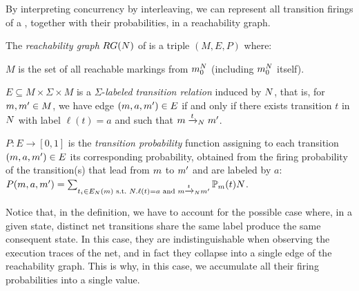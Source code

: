 By interpreting concurrency by interleaving, we can represent all transition firings of a \uswn, together with their probabilities, in a reachability graph.

\begin{definition}
The \emph{reachability graph} $RG(N)$ of \uswn \net is a triple $(M,E,P)$ where:
\begin{compactitem}[$\bullet$]
\item $M$ is the set of all reachable markings from $m_0^{N}$ (including $m_0^{N}$ itself).
\item $E \subseteq M \times \Sigma \times M$ is a $\Sigma$-\emph{labeled transition relation} induced by $N$, that is, for $m,m' \in M$, we have edge $(m,a,m') \in E$ if and only if there exists transition $t$ in $N$ with label $\ell(t) = a$ and such that $m\xrightarrow{t}_{N}m'$.
\item $P:E \rightarrow [0,1]$ is the \emph{transition probability} function assigning to each transition $(m,a,m') \in E$ its corresponding probability, obtained from the firing probability of the \uswn transition(s) that lead from $m$ to $m'$ and are labeled by $a$: $P(m,a,m') = \sum_{t_i \in E_{N}(m) \text{ s.t.~} N.\ell(t) = a \text{ and } m\xrightarrow{t}_{N}m'} \mathbb{P}_{m}(t){N}$.
\end{compactitem}
\end{definition}
Notice that, in the definition, we have to account for the possible case where, in a given state, distinct net transitions share the same label produce the same consequent state. In this case, they are indistinguishable when observing the execution traces of the net, and in fact they collapse into a single edge of the reachability graph. This is why, in this case, we accumulate all their firing probabilities into a single value.


